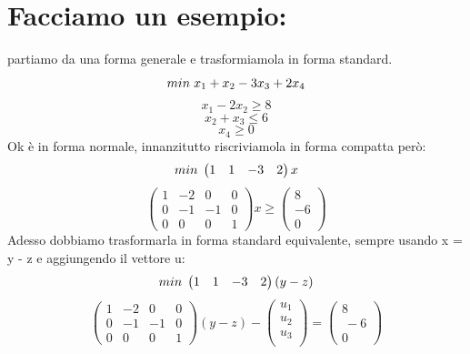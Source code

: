 \section{Facciamo un esempio:} partiamo da una forma generale e trasformiamola in forma standard.
\begin{equation*}
    min \hspace{0.1cm} x_1 + x_2 - 3x_3 + 2x_4
\end{equation*}
\begin{equation*}
    x_1 - 2x_2 \geq 8
\end{equation*}
\begin{equation*}
    x_2 + x_3 \leq 6
\end{equation*}
\begin{equation*}
    x_4 \geq 0
\end{equation*}
Ok è in forma normale, innanzitutto riscriviamola in forma compatta però:
\begin{equation*}
    min \hspace{0.1cm} \begin{pmatrix}
        1 & 1 & -3 & 2
    \end{pmatrix}x
\end{equation*}
\begin{equation*}
    \begin{pmatrix}
        1 & -2 & 0 & 0\\
        0 & -1 & -1 & 0\\
        0 & 0 & 0 & 1
    \end{pmatrix}x \geq \begin{pmatrix}
        8\\
        -6\\
        0
    \end{pmatrix}
\end{equation*}
Adesso dobbiamo trasformarla in forma standard equivalente, sempre usando x = y - z e aggiungendo il vettore u:
\begin{equation*}
    min \hspace{0.1cm} \begin{pmatrix}
        1 & 1 & -3 & 2
    \end{pmatrix}(y-z) 
\end{equation*}
\begin{equation*}
    \begin{pmatrix}
        1 & -2 & 0 & 0\\
        0 & -1 & -1 & 0\\
        0 & 0 & 0 & 1
    \end{pmatrix}(y-z) - \begin{pmatrix}
        u_1\\
        u_2\\
        u_3\\
    \end{pmatrix} = \begin{pmatrix}
        8\\\
        -6\\
        0
    \end{pmatrix}
\end{equation*}
